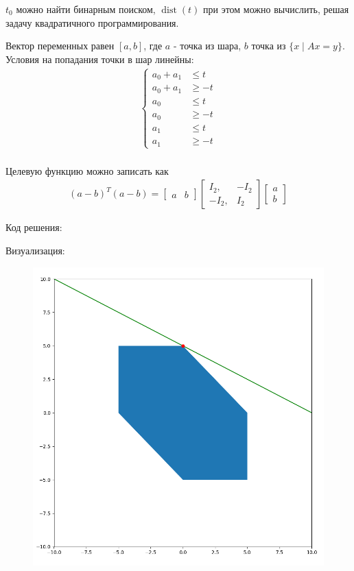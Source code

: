 \documentclass{article}
\DeclareMathOperator{\dist}{dist}
\begin{document}
    $t_0$ можно найти бинарным поиском, $\dist(t)$ при этом можно вычислить, решая задачу квадратичного программирования. 
    
    Вектор переменных равен $[a, b]$, где $a$ - точка из шара, $b$ точка из $\{x \mid Ax = y\}$. Условия на попадания точки в шар линейны:
    \begin{align*}
          \begin{cases} 
            a_0 + a_1 &\le t\\
            a_0 + a_1 &\ge -t\\
            a_0 &\le t\\
            a_0 &\ge -t\\
            a_1 &\le t\\
            a_1 &\ge -t
        \end{cases}\\
    \end{align*}
    
    Целевую функцию можно записать как
    \begin{align*}
        (a - b)^T(a - b) = [\begin{matrix} a & b\end{matrix}]
            \left[
            \begin{matrix}
                I_2,  & -I_2\\
                -I_2, &  I_2
            \end{matrix}
            \right] 
            \left[
            \begin{matrix}
                a\\
                b
            \end{matrix}
            \right] 
    \end{align*}
    
    \newpage
    Код решения:
    
    
    Визуализация:
    \begin{figure}[ht]
        \includegraphics[width=0.8\linewidth]{Screenshots/task5.png}
    \end{figure} 
    
\end{document}
